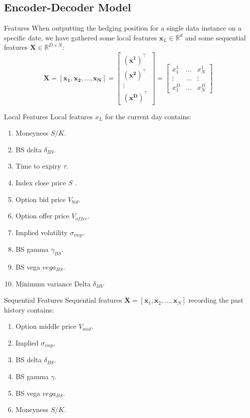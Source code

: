 \documentclass[10pt,table,mathserif]{beamer}
\newcommand{\vx}{\mathbf{x}}
\newcommand{\Real}{\mathbb{R}}
\begin{document}
\subsection{Encoder-Decoder Model}
\begin{frame}[fragile]{Features}
When outputting the hedging position for a single data instance on a specific date, we have gathered some local features $\vx_L \in \Real^d$ and some sequential features $\mathbf{X} \in \Real^{D \times N}$:
\[
\mathbf{X}=\left[\mathbf{{x_1}},\mathbf{{x_2}},\dots,\mathbf{{x_N}}\right]=\left[
\begin{array}{c}
  (\mathbf{{x^1}})^{\top} \\
  (\mathbf{{x^2}})^{\top}  \\
 \vdots \\
  (\mathbf{{x^D}})^{\top}
\end{array}
\right]=
\left[
\begin{array}{ccc}
   x^1_1&\dots& x^1_N\\
   \vdots&\dots& \vdots\\
  x^D_1&\dots&x^D_N
\end{array}
\right]
\]
\end{frame}

\begin{frame}[fragile]{Local Features}
Local features $x_L$ for the current day contains:
\begin{enumerate}
	\item Moneyness $S/K$.
	\item BS delta $\delta_{BS}$.
	\item Time to expiry $\tau$.
	\item Index close price $S$ .
	\item Option bid price $V_{bid}$.
	\item Option offer price $V_{offer}$.
	\item Implied volatility $\sigma_{imp}$.
	\item BS gamma $\gamma_{BS}$.
	\item BS vega $vega_{BS}$.
	\item Minimum variance Delta $\delta_{MV}$
\end{enumerate}
\end{frame}


\begin{frame}[fragile]{Sequential Features}
Sequential features $\textbf{X}=[\vx_1,\vx_2,\dots,\vx_N]$ recording the past history contains:
\begin{enumerate}
	\item  Option middle price $V_{mid}$.
	\item  Implied $\sigma_{imp}$.
	\item  BS delta $\delta_{BS}$.
	\item  BS gamma $\gamma$.
	\item  BS vega $vega_{BS}$.
	\item  Moneyness $S/K$.
\end{enumerate}
\end{frame}
\end{document}
